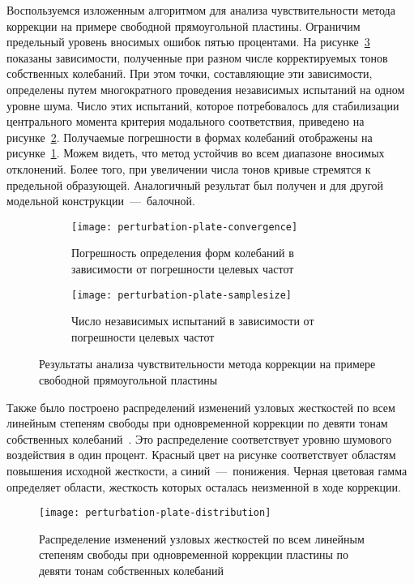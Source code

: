Воспользуемся изложенным алгоритмом для анализа чувствительности метода коррекции на примере свободной прямоугольной пластины. Ограничим предельный уровень вносимых ошибок пятью процентами. На рисунке~\ref{fig:perturbation-plate} показаны зависимости, полученные при разном числе корректируемых тонов собственных колебаний. При этом точки, составляющие эти зависимости, определены путем многократного проведения независимых испытаний на одном уровне шума. Число этих испытаний, которое потребовалось для стабилизации центрального момента критерия модального соответствия, приведено на рисунке~\ref{fig:perturbation-plate-samplesize}. Получаемые погрешности в формах колебаний отображены на рисунке~\ref{fig:perturbation-plate-convergence}. Можем видеть, что метод устойчив во всем диапазоне вносимых отклонений. Более того, при увеличении числа тонов кривые стремятся к предельной образующей. Аналогичный результат был получен и для другой модельной конструкции~---~балочной.

\begin{figure}[!htb]
	\begin{subfigure}[b]{0.46\textwidth}
		\texttt{[image: perturbation-plate-convergence]}
		\caption{Погрешность определения форм колебаний в зависимости от погрешности целевых частот} \label{fig:perturbation-plate-convergence}
	\end{subfigure}
	\hfill
	\begin{subfigure}[b]{0.48\textwidth}
		\texttt{[image: perturbation-plate-samplesize]}
		\caption{Число независимых испытаний в зависимости от погрешности целевых частот} \label{fig:perturbation-plate-samplesize}
	\end{subfigure}
	\caption{Результаты анализа чувствительности метода коррекции на примере свободной прямоугольной пластины} \label{fig:perturbation-plate}
\end{figure}

Также было построено распределений изменений узловых жесткостей по всем линейным степеням свободы при одновременной коррекции по девяти тонам собственных колебаний~. Это распределение соответствует уровню шумового воздействия в один процент. Красный цвет на рисунке соответствует областям повышения исходной жесткости, а синий~---~понижения. Черная цветовая гамма определяет области, жесткость которых осталась неизменной в ходе коррекции.

\begin{figure}[!htb]
	\centering
	\texttt{[image: perturbation-plate-distribution]}
	\caption{Распределение изменений узловых жесткостей по всем линейным степеням свободы при одновременной коррекции пластины по девяти тонам собственных колебаний} \label{fig:perturbation-plate-distribution}
\end{figure}


